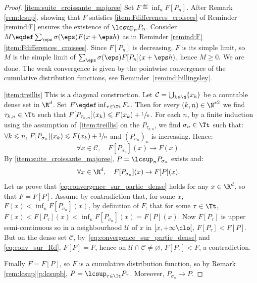 \skpt
\begin{proof}
\eqref{item:suite_croissante_majoree}
Set $F\eqdef\inf_nF[P_n]$. After Remark \ref{rem:lcsup}, showing that $F$ satisfies \eqref{item:Fdifferences_croisees} of Reminder \ref{remind:F} ensures the existence of $\lcsup_nP_n$. Consider $M\eqdef\sum_{\eps} \sigma(\eps) F(x+\eps h)$ as in Reminder \ref{remind:F}\eqref{item:Fdifferences_croisees}. Since $F[P_n]$ is decreasing, $F$ is its simple limit, so $M$ is the simple limit of $\sum_{\eps} \sigma(\eps) F[P_n](x+\eps h)$, hence $M\geqslant0$. We are done. The weak convergence is given by the pointwise convergence of the cumulative distribution functions, see Reminder~\ref{remind:billingsley}.

\eqref{item:treillis}
This is a diagonal construction. Let $\mathcal{C}=\bigcup_{k\in\N}\{x_k\}$ be a countable dense set in $\R^d$. Set $F\eqdef\inf_{\tau\in\Tt}F_\tau$. Then for every $(k,n)\in\N^{\ast2}$ we find $\tau_{k,n}\in \Tt$ such that $F[P_{\tau_{k,n}}](x_k)\leqslant F(x_k)+\sfrac1n$. For each $n$, by a finite induction using the assumption of~\eqref{item:treillis} on the $P_{\tau_{k,n}}$, we find $\sigma_{n}\in \Tt$ such that: $\forall k\leqslant n,\, F[P_{\sigma_{n}}](x_k)\leqslant F(x_k)+\sfrac1n$ and $(P_{\sigma_n})_n$ is increasing. Hence:
\begin{equation}\label{eq:convergence_sur_partie_dense}
\forall x\in \mathcal{C},\quad F[P_{\sigma_{n}}](x)\to F(x).
\end{equation}
By \eqref{item:suite_croissante_majoree}, $P=\lcsup_n P_{\sigma_n}$ exists and:
\begin{equation}\label{eq:conv_sur_Rd}
\forall x\in \R^d,\quad F[P_{\sigma_{n}}](x)\to F[P](x).
\end{equation}
Let us prove that \eqref{eq:convergence_sur_partie_dense} holds for any $x\in\R^d$, so that $F=F[P]$. Assume by contradiction that, for some $x$, $F(x)<\inf_nF[P_{\sigma_n}](x)$, \ie by definition of $F$, that for some $\tau\in\Tt$, $F(x)<F[P_\tau](x)<\inf_nF[P_{\sigma_n}](x)=F[P](x)$. Now $F[P_\tau]$ is upper semi-continuous so in a neighbourhood $\mathcal{U}$ of $x$ in $[x,+\infty\clo[$, $F[P_\tau]<F[P]$. But on the dense set $\mathcal{C}$, by~\eqref{eq:convergence_sur_partie_dense} and \eqref{eq:conv_sur_Rd}, $F[P]=F$, hence on $\mathcal{U}\cap\mathcal{C}\neq\varnothing$, $F[P_\tau]<F$, a contradiction.

Finally $F=F[P]$, so $F$ is a cumulative distribution function, so by Remark \ref{rem:lcsup}\eqref{p:lcsupb}, $P=\lcsup_{\tau\in\Tt}P_{\tau}$. Moreover, $P_{\sigma_n}\to P$.
\end{proof}

